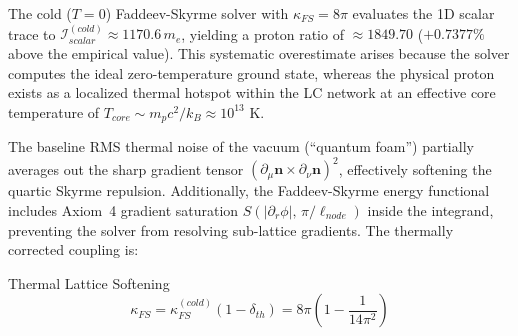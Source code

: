 The cold ($T=0$) Faddeev-Skyrme solver with $\kappa_{FS} = 8\pi$ evaluates the 1D scalar trace to $\mathcal{I}_{scalar}^{(cold)} \approx 1170.6\,m_e$, yielding a proton ratio of $\approx 1849.70$ ($+0.7377\%$ above the empirical value). This systematic overestimate arises because the solver computes the ideal zero-temperature ground state, whereas the physical proton exists as a localized thermal hotspot within the LC network at an effective core temperature of $T_{core} \sim m_p c^2/k_B \approx 10^{13}\text{ K}$.

The baseline RMS thermal noise of the vacuum (``quantum foam'') partially averages out the sharp gradient tensor $(\partial_\mu \mathbf{n} \times \partial_\nu \mathbf{n})^2$, effectively softening the quartic Skyrme repulsion.  Additionally, the Faddeev-Skyrme energy functional includes Axiom~4 gradient saturation $S(|\partial_r\phi|,\,\pi/\ell_{node})$ inside the integrand, preventing the solver from resolving sub-lattice gradients.  The thermally corrected coupling is:
\begin{resultbox}{Thermal Lattice Softening}
\begin{equation}
\kappa_{FS} = \kappa_{FS}^{(cold)} \left(1 - \delta_{th}\right) = 8\pi\left(1 - \frac{1}{14\pi^2}\right)
\end{equation}
\end{resultbox}


